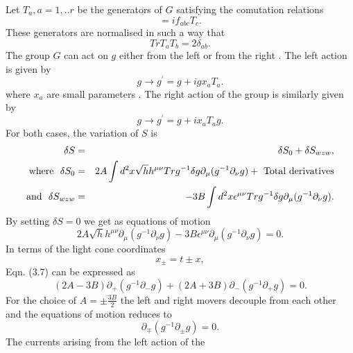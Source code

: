 \documentclass[a4paper,12pt]{article}
\begin{document}
Let $ T_{a},a=1,..r $ be the generators of $G$
satisfying the comutation relations
\begin{equation}
[T_a,T_b]=if_{abc}T_c .
\end{equation}
These generators are normalised in such a way that 
\begin{equation}
TrT_aT_b=2{\delta}_{ab}.
\end{equation}
The group $G$ can act on $g$ either from the 
left or from the right . The left action is given by 
\begin{equation}
g{\longrightarrow}g^{'}=g + i g x_a T_a .
\end{equation}
where $ x_a $ are small parameters . 
The right action of the group is similarly given by 
\begin{equation}
g{\longrightarrow}g^{'}=g + i x_a T_a g .
\end{equation} 
For both cases, the variation of $ S $  is  
\begin{eqnarray}
{\delta}S&=&{\delta}S_0 + {\delta}S_{wzw},\nonumber\\
{\rm where}~~
{\delta}S_0&=&2A\int d^2x {\sqrt{h}}h^{{\mu}{\nu}} 
Trg^{-1}{\delta}g {\partial}_{\mu}(g^{-1}{\partial}_{\nu}g) 
+ \rm{~Total ~derivatives }\nonumber\\ 
{\rm and}~~
{\delta}S_{wzw}&=&-3B\int d^2x {\epsilon}^{{\mu}{\nu}} 
Trg^{-1}{\delta}g{\partial}_{\mu}(g^{-1}{\partial}_{\nu} g ).\nonumber\\
\end{eqnarray}
By setting $ {\delta}S=0 $ we get as equations of motion 
\begin{equation}
2A{\sqrt{h}}h^{{\mu}{\nu}}{\partial}_{\mu}(g^{-1}{\partial}_{\nu} g)-3B
{\epsilon}^{{\mu}{\nu}}{\partial}_{\mu}(g^{-1}{\partial}_{\nu} g)=0.
\end{equation}
In terms of the light cone coordinates
\begin{equation}
x_{\pm}=t{\pm}x,
\end{equation}
Eqn. (3.7) can be expressed as  
\begin{equation}
(2A -3B){\partial}_{+}(g^{-1}{\partial}_{-}g)+
(2A +3B){\partial}_{-}(g^{-1}{\partial}_{+}g)=0.
\end{equation}
For the choice of 
$A={\pm}{\frac{3B}{2}}$ the left and right movers decouple from each other
and the equations of motion reduces to
\begin{equation}
{\partial}_{\mp}(g^{-1}{\partial}_{\pm}g)=0.
\end{equation} 
The  currents arising  from the left action of the
\end{document}
